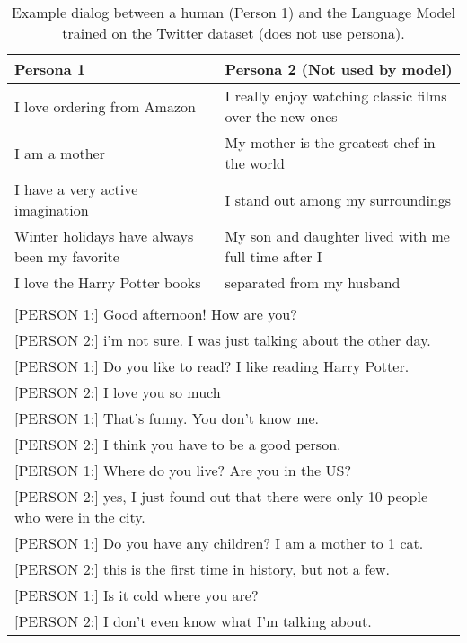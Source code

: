\begin{table*}[t]
  \begin{center}
    \begin{small}
      \begin{tabular}{l|l}
        \toprule
        \textbf{Persona 1} & \textbf{Persona 2 (Not used by model)}\\
     \midrule   
I love ordering from Amazon & I really enjoy watching classic films over the new ones \\ 
I am a mother & My mother is the greatest chef in the world \\
I have a very active imagination & I stand out among my surroundings  \\
Winter holidays have always been my favorite & My son and daughter lived with me full time after I\\
I love the Harry Potter books &  \hspace{2em} separated from my husband\\
\bottomrule
\multicolumn{2}{l}{ }\\
\multicolumn{2}{l}{[PERSON 1:] Good afternoon! How are you?}\\
\multicolumn{2}{l}{[PERSON 2:] i'm not sure. I was just talking about the other day.}\\
\multicolumn{2}{l}{[PERSON 1:] Do you like to read? I like reading Harry Potter. }\\
\multicolumn{2}{l}{[PERSON 2:] I love you so much}\\
\multicolumn{2}{l}{[PERSON 1:] That's funny. You don't know me.}\\
\multicolumn{2}{l}{[PERSON 2:] I think you have to be a good person.}\\
\multicolumn{2}{l}{[PERSON 1:] Where do you live? Are you in the US?}\\
\multicolumn{2}{l}{[PERSON 2:] yes, I just found out that there were only 10 people who were in the city.}\\
\multicolumn{2}{l}{[PERSON 1:] Do you have any children? I am a mother to 1 cat. }\\
\multicolumn{2}{l}{[PERSON 2:] this is the first time in history, but not a few.}\\
\multicolumn{2}{l}{[PERSON 1:] Is it cold where you are?}\\
\multicolumn{2}{l}{[PERSON 2:] I don't even know what I'm talking about.}\\
      \end{tabular}
      \caption{Example dialog between a human (Person 1) and the Language Model trained on the Twitter dataset (does not use persona). %
 \label{table:twitter-example}}
    \end{small}
  \end{center}
\end{table*}


